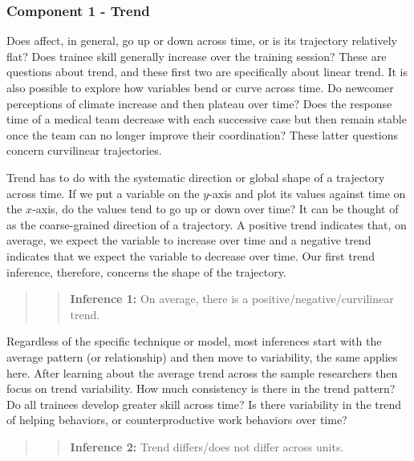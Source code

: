 \documentclass[english,,man]{apa6}
\theoremstyle{definition}
\theoremstyle{definition}
\theoremstyle{definition}
\theoremstyle{remark}
\begin{document}
\hypertarget{component-1---trend}{%
\subsubsection{Component 1 - Trend}\label{component-1---trend}}

Does affect, in general, go up or down across time, or is its trajectory
relatively flat? Does trainee skill generally increase over the training
session? These are questions about trend, and these first two are
specifically about linear trend. It is also possible to explore how
variables bend or curve across time. Do newcomer perceptions of climate
increase and then plateau over time? Does the response time of a medical
team decrease with each successive case but then remain stable once the
team can no longer improve their coordination? These latter questions
concern curvilinear trajectories.

Trend has to do with the systematic direction or global shape of a
trajectory across time. If we put a variable on the \(y\)-axis and plot
its values against time on the \(x\)-axis, do the values tend to go up
or down over time? It can be thought of as the coarse-grained direction
of a trajectory. A positive trend indicates that, on average, we expect
the variable to increase over time and a negative trend indicates that
we expect the variable to decrease over time. Our first trend inference,
therefore, concerns the shape of the trajectory.

\begin{quote}
\begin{quote}
\textbf{Inference 1:} On average, there is a
positive/negative/curvilinear trend.
\end{quote}
\end{quote}

Regardless of the specific technique or model, most inferences start
with the average pattern (or relationship) and then move to variability,
the same applies here. After learning about the average trend across the
sample researchers then focus on trend variability. How much consistency
is there in the trend pattern? Do all trainees develop greater skill
across time? Is there variability in the trend of helping behaviors, or
counterproductive work behaviors over time?

\begin{quote}
\begin{quote}
\textbf{Inference 2:} Trend differs/does not differ across units.
\end{quote}
\end{quote}
\end{document}
